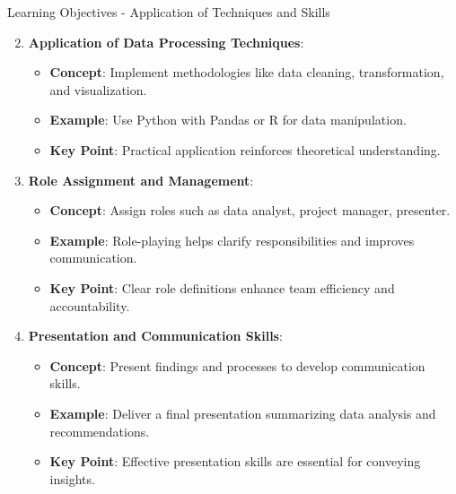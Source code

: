 \documentclass[aspectratio=169]{beamer}
\begin{document}
\begin{frame}[fragile]{Learning Objectives - Application of Techniques and Skills}
    \begin{enumerate}
        \setcounter{enumi}{1}
        \item \textbf{Application of Data Processing Techniques}:
            \begin{itemize}
                \item \textbf{Concept}: Implement methodologies like data cleaning, transformation, and visualization.
                \item \textbf{Example}: Use Python with Pandas or R for data manipulation.
                \item \textbf{Key Point}: Practical application reinforces theoretical understanding.
            \end{itemize}
        
        \item \textbf{Role Assignment and Management}:
            \begin{itemize}
                \item \textbf{Concept}: Assign roles such as data analyst, project manager, presenter.
                \item \textbf{Example}: Role-playing helps clarify responsibilities and improves communication.
                \item \textbf{Key Point}: Clear role definitions enhance team efficiency and accountability.
            \end{itemize}

        \item \textbf{Presentation and Communication Skills}:
            \begin{itemize}
                \item \textbf{Concept}: Present findings and processes to develop communication skills.
                \item \textbf{Example}: Deliver a final presentation summarizing data analysis and recommendations.
                \item \textbf{Key Point}: Effective presentation skills are essential for conveying insights.
            \end{itemize}
    \end{enumerate}
\end{frame}
\end{document}
